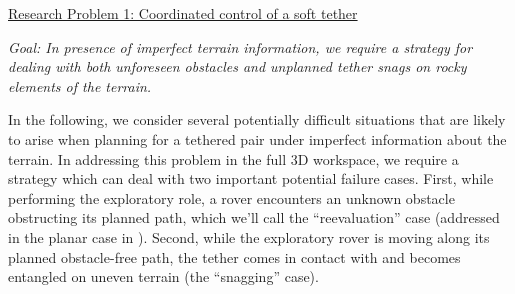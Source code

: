 \documentclass[12pt]{article}
\begin{document}

\noindent\underline{Research Problem 1: Coordinated control of a soft tether}

{\sl Goal: In presence of imperfect terrain information, we require a strategy for dealing with both 
unforeseen obstacles and unplanned tether snags on rocky elements of the terrain. }

In the following, we consider several potentially difficult situations that are likely 
to arise when planning for a tethered pair under imperfect information about the terrain. In 
addressing this problem in the full 3D workspace, we 
require a strategy which can deal with two important potential failure cases. First, while performing the exploratory role, a rover 
encounters an unknown obstacle obstructing its planned path, which we'll call the 
``reevaluation'' case (addressed in the planar case in \cite{axel_online}).
Second, while the exploratory rover is moving along its planned obstacle-free path, the tether comes in contact with and 
becomes entangled on uneven terrain (the ``snagging'' case).
\end{document}
